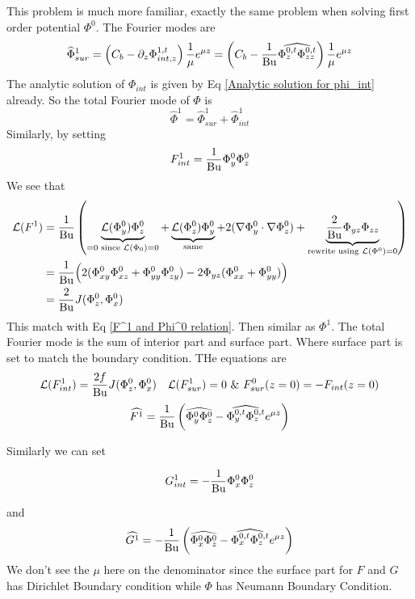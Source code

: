 \documentclass[../SQG_notes.tex]{subfiles}
\begin{document}
This problem is much more familiar, exactly the same problem when solving first order potential $\Phi^0$. The Fourier modes are 
\[ \widehat{\Phi}_{sur}^1 =\left( C_b - \partial_z \Phi_{int,z}^{1,t} \right) \frac{1}{\mu}e^{\mu z}= \left(C_b - \frac{1}{\text{Bu}}\widehat{\Phi_z^{0,t}\Phi_{zz}^{0,t}}\right) \frac{1}{\mu}e^{\mu z}\]
The analytic solution of $\Phi_{int}$ is given by Eq \ref{Analytic solution for phi_int} already. So the total Fourier mode of $\Phi$ is 
\begin{equation}
    \widehat{\Phi}^1 = \widehat{\Phi}_{sur}^1 + \widehat{\Phi}_{int}^1 \label{Fourier transform of Phi^1}
\end{equation}
Similarly, by setting
\[ F^1_{int} = \frac{1}{\text{Bu}} \Phi_y^0 \Phi_z^0\]
We see that 
\begin{align*}
    \mathcal{L}(F^1) &=  \frac{1}{\text{Bu}}\left(\underbrace{\mathcal{L}(\Phi_y^0)\Phi_z^0}_{=0 \text{ since } \mathcal{L}(\Phi_0) = 0} +\underbrace{\mathcal{L}(\Phi_z^0)\Phi_y^0}_{\text{same}} + 2(\nabla\Phi_y^0 \cdot \nabla \Phi_z^0) + \underbrace{\frac{2}{\text{Bu}}\Phi_{yz}\Phi_{zz}}_{\text{rewrite using } \mathcal{L}(\Phi^0) = 0}\right) \\
    &=  \frac{1}{\text{Bu}} \Big(2(\Phi_{xy}^0\Phi_{xz}^0 + \Phi_{yy}^0\Phi_{zy}^0) - 2\Phi_{yz}(\Phi_{xx}^0 + \Phi_{yy}^0)\Big) \\
    &= \frac{2}{\text{Bu}}J(\Phi_z^0, \Phi_x^0)
\end{align*}
This match with Eq \ref{F^1 and Phi^0 relation}. Then similar as $\Phi^1$. The total Fourier mode is the sum of interior part and surface part. Where surface part is set to match the boundary condition. THe equations are 
\[ \mcalL(F_{int}^1) = \frac{2f}{\Bur} J(\Phi_z^0, \Phi_x^0) \quad \mcalL(F_{sur}^1) = 0 \ \& \ F_{sur}^{0}(z = 0) = -F_{int}(z = 0)\]
\begin{equation}
    \widehat{F^1} = \frac{1}{\text{Bu}} \left( \widehat{\Phi_y^0\Phi_z^0} - \widehat{\Phi_y^{0,t}\Phi_z^{0,t}} e^{\mu z}\right) \label{F^1 fourier transform}
\end{equation}

Similarly we can set 

\[ G^1_{int} = -\frac{1}{\text{Bu}} \Phi_x^0\Phi_z^0\]

and 
\begin{equation}
    \widehat{G^1} = -\frac{1}{\text{Bu}} \left( \widehat{\Phi_x^0\Phi_z^0} - \widehat{\Phi_x^{0,t}\Phi_z^{0,t}} e^{\mu z}\right) \label{G^1 fourier transform}
\end{equation}
We don't see the $\mu$ here on the denominator since the surface part for $F$ and $G$ has Dirichlet Boundary condition  while $\Phi$ has Neumann Boundary Condition. \par
\end{document}
